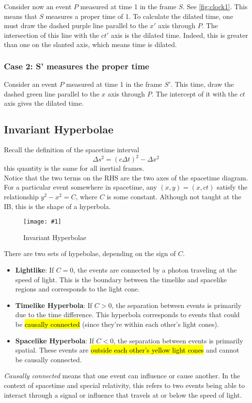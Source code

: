 \documentclass[a4paper,12pt]{article}
\newcommand{\lb}{\\[8pt]}
\newcommand{\img}[4]{\begin{center}
  \begin{figure}[H]
    \centering
    \texttt{[image: \#1]}
    \caption{#3}
    \label{fig:#4}
  \end{figure}
\end{center}}
\begin{document}
Consider now an event $P$ measured at time 1 in the frame $S$. See \cref{fig:clock1}. This means that $S$ measures a proper time of 1. To calculate the dilated time, one must draw the dashed purple line parallel to the $x'$ axis through $P$. The intersection of this line with the $ct'$ axis is the dilated time. Indeed, this is greater than one on the slanted axis, which means time is dilated.

\subsubsection*{Case 2: S' measures the proper time}

Consider an event $P$ measured at time 1 in the frame $S'$. This time, draw the dashed green line parallel to the $x$ axis through $P$. The intercept of it with the $ct$ axis gives the dilated time.

\pagebreak

\subsection{Invariant Hyperbolae}

Recall the definition of the spacetime interval
$$
  \Delta s^2 = (c\Delta t)^2 - \Delta x^2
$$
this quantity is the same for all inertial frames.\lb
Notice that the two terms on the RHS are the two axes of the spacetime diagram. For a particular event somewhere in spacetime, any $(x, y) = (x, ct)$ satisfy the relationship $y^2 - x^2 = C$, where $C$ is some constant. Although not taught at the IB, this is the shape of a hyperbola.
\img{hyperbolae.png}{0.7}{Invariant Hyperbolae}{hyperbolae}
There are two sets of hypebolae, depending on the sign of $C$.
\begin{itemize}
  \item \textbf{Lightlike}: If $C = 0$, the events are connected by a photon traveling at the speed of light. This is the boundary between the timelike and spacelike regions and corresponds to the light cone.
  \item \textbf{Timelike Hyperbola}: If $C > 0$, the separation between events is primarily due to the time difference. This hyperbola corresponds to events that could be \hl{causally connected} (since they're within each other's light cones).
  \item \textbf{Spacelike Hyperbola}: If $C < 0$, the separation between events is primarily spatial. These events are \hl{outside each other's yellow light cones} and cannot be causally connected.
\end{itemize}

\textit{Causally connected} means that one event can influence or cause another. In the context of spacetime and special relativity, this refers to two events being able to interact through a signal or influence that travels at or below the speed of light.
\end{document}
